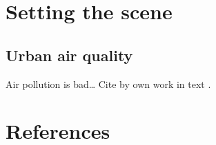 \begin{refsection}


\section{Setting the scene}

\subsection{Urban air quality}

Air pollution is bad\dots \supercite{Fenger1999, Fenger2009} Cite by own work in text \citet{Grange2017c}. 

\clearpage
\section{References}

\printbibliography[heading = none]

\end{refsection}

% 
